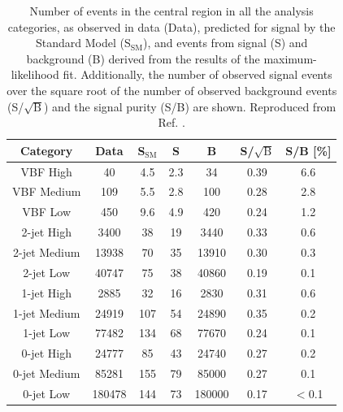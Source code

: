\begin{table}[htb]
  \centering
  \caption{
  Number of events in the central region in all the analysis categories,
  as observed in data (Data), predicted for signal by the Standard Model
  (S$_\text{SM}$), and events from signal (S) and background (B) derived
  from the results of the maximum-likelihood fit. Additionally, the
  number of observed signal events over the square root of the number of
  observed background events (S/$\sqrt{\text{B}}$) and the signal purity
  (S/B) are shown. Reproduced from Ref. \cite{ATLAS-CONF-2019-028}.
  }
  \label{tab:hmumu:results}
  \begin{tabular}{ c c c c c c c }
    \toprule
    \midrule
    Category        & Data     & S$_\text{SM}$  &   S     &    B     & S/$\sqrt{\text{B}}$ & S/B [\%] \\
    \midrule
    VBF High        & 40       &  4.5           &  2.3    & 34       &  0.39               &  6.6 \\
    VBF Medium      & 109      &  5.5           &  2.8    & 100      &  0.28               &  2.8 \\
    VBF Low         & 450      &  9.6           &  4.9    & 420      &  0.24               &  1.2 \\
    2-jet High      & 3400     &    38          &  19     & 3440     &  0.33               &  0.6 \\
    2-jet Medium    & 13938    &    70          &  35     & 13910    &  0.30               &  0.3 \\
    2-jet Low       & 40747    &    75          &  38     & 40860    &  0.19               &  0.1 \\
    1-jet High      & 2885     &    32          &  16     &  2830    &  0.31               &  0.6 \\
    1-jet Medium    & 24919    &  107           &  54     & 24890    &  0.35               &  0.2 \\
    1-jet Low       & 77482    &  134           &  68     & 77670    &  0.24               &  0.1 \\
    0-jet High      & 24777    &  85            &  43     & 24740    &  0.27               &  0.2 \\
    0-jet Medium    & 85281    &  155           &  79     & 85000    &  0.27               &  0.1 \\
    0-jet Low       & 180478   &  144           &  73     & 180000   &  0.17               &  $<$0.1 \\
    \midrule
    \bottomrule
  \end{tabular}
\end{table}

